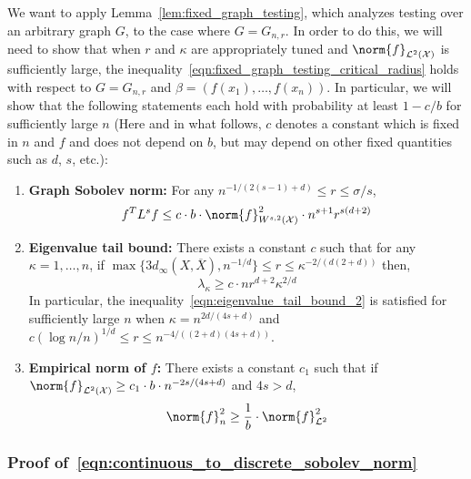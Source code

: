 \documentclass{article}
\newcommand{\1}{\mathbf{1}}
\newcommand{\Xset}{\mathcal{X}}
\newcommand{\Leb}{\mathcal{L}}
\newcommand{\ol}[1]{\overline{#1}}
\theoremstyle{alden}
\theoremstyle{aldenthm}
\theoremstyle{definition}
\theoremstyle{remark}
\begin{document}
We want to apply Lemma~\ref{lem:fixed_graph_testing}, which analyzes testing over an arbitrary graph $G$, to the case where $G = G_{n,r}$. In order to do this, we will need to show that when $r$ and $\kappa$ are appropriately tuned and $\norm{f}_{\Leb^2(\mathcal{X})}$ is sufficiently large, the inequality~\eqref{eqn:fixed_graph_testing_critical_radius} holds with respect to $G = G_{n,r}$ and $\beta = (f(x_1),\ldots,f(x_n))$. In particular, we will show that the following statements each hold with probability at least $1 - c/b$ for sufficiently large $n$ (Here and in what follows, $c$ denotes a constant which is fixed in $n$ and $f$ and does not depend on $b$, but may depend on other fixed quantities such as $d$, $s$, etc.): 
\begin{enumerate}[label=(E\arabic*)]
	\item 
	\label{event:discrete_sobolev_norm}
	\textbf{Graph Sobolev norm:} For any $n^{-1/(2(s - 1) + d)}\leq r \leq \sigma/s$,
	\begin{equation}
	\label{eqn:continuous_to_discrete_sobolev_norm}
	f^T L^s f \leq c \cdot b \cdot \norm{f}_{W^{s,2}(\Xset)}^2 \cdot n^{s + 1} r^{s(d + 2)} 
	\end{equation}
	\item 
	\label{event:eigenvalue_tail_decay_2}
	\textbf{Eigenvalue tail bound:} There exists a constant $c$ such that for any $\kappa = 1,\ldots,n$, if $\max\{ 3 d_{\infty}(X,\ol{X}),n^{-1/d}\} \leq r \leq \kappa^{-2/(d(2 +d))}$ then,
	\begin{equation}
	\label{eqn:eigenvalue_tail_bound_2}
	\lambda_{\kappa} \geq c \cdot n r^{d + 2} \kappa^{2/d}
	\end{equation}
	In particular, the inequality~\eqref{eqn:eigenvalue_tail_bound_2} is satisfied for sufficiently large $n$ when $\kappa = n^{2d/(4s + d)}$ and $c(\log n/n)^{1/d} \leq r \leq n^{-4/((2+d)(4s + d))}$. 
	\item 
	\label{event:l2_norm}
	\textbf{Empirical norm of $f$:} There exists a constant $c_1$ such that if $\norm{f}_{\Leb^2(\Xset)} \geq c_1 \cdot b \cdot n^{-2s/(4s + d)}$ and $4s > d$,
	\begin{equation}
	\label{eqn:l2_to_empirical_norm}
	\norm{f}_n^2 \geq \frac{1}{b} \cdot \norm{f}_{\Leb^2}^2
	\end{equation}
\end{enumerate} 

\subsubsection{Proof of~\eqref{eqn:continuous_to_discrete_sobolev_norm}}
\end{document}
